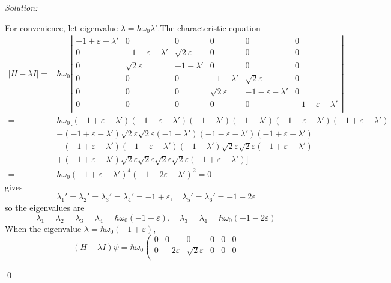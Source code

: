 \documentclass[12pt,a4paper]{article}
\newenvironment{sol}
    {\emph{Solution:}
    }
    {
    \qed
    }
\begin{document}
\begin{sol}
For convenience, let eigenvalue $\lambda=\hbar\omega_0\lambda'$.The characteristic equation
\begin{align}
\nonumber|H-\lambda I|=&\hbar\omega_0\left|\begin{array}{cccccc}
-1+\varepsilon-\lambda'&0&0&0&0&0\\
0&-1-\varepsilon-\lambda'&\sqrt{2}\varepsilon&0&0&0\\
0&\sqrt{2}\varepsilon&-1-\lambda'&0&0&0\\
0&0&0&-1-\lambda'&\sqrt{2}\varepsilon&0\\
0&0&0&\sqrt{2}\varepsilon&-1-\varepsilon-\lambda'&0\\
0&0&0&0&0&-1+\varepsilon-\lambda'\\
\end{array}\right|\\
\nonumber=&\hbar\omega_0[(-1+\varepsilon-\lambda')(-1-\varepsilon-\lambda')(-1-\lambda')(-1-\lambda')(-1-\varepsilon-\lambda')(-1+\varepsilon-\lambda')\\
\nonumber&-(-1+\varepsilon-\lambda')\sqrt{2}\varepsilon\sqrt{2}\varepsilon(-1-\lambda')(-1-\varepsilon-\lambda')(-1+\varepsilon-\lambda')\\
\nonumber&-(-1+\varepsilon-\lambda')(-1-\varepsilon-\lambda')(-1-\lambda')\sqrt{2}\varepsilon\sqrt{2}\varepsilon(-1+\varepsilon-\lambda')\\
\nonumber&+(-1+\varepsilon-\lambda')\sqrt{2}\varepsilon\sqrt{2}\varepsilon\sqrt{2}\varepsilon\sqrt{2}\varepsilon(-1+\varepsilon-\lambda')]\\
=&\hbar\omega_0(-1+\varepsilon-\lambda')^4(-1-2\varepsilon-\lambda')^2=0
\end{align}
gives
\begin{equation}
\lambda_1'=\lambda_2'=\lambda_3'=\lambda_4'=-1+\varepsilon,\quad\lambda_5'=\lambda_6'=-1-2\varepsilon
\end{equation}
so the eigenvalues are
\begin{equation}
\lambda_1=\lambda_2=\lambda_3=\lambda_4=\hbar\omega_0(-1+\varepsilon),\quad\lambda_3=\lambda_4=\hbar\omega_0(-1-2\varepsilon)
\end{equation}
When the eigenvalue $\lambda=\hbar\omega_0(-1+\varepsilon)$,
\begin{equation}
(H-\lambda I)\psi=\hbar\omega_0\left(\begin{array}{cccccc}
0&0&0&0&0&0\\
0&-2\varepsilon&\sqrt{2}\varepsilon&0&0&0\\

\end{array}
\end{equation}
\end{sol}
\end{document}
